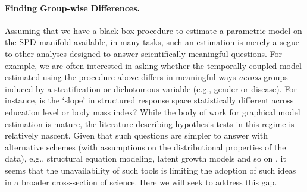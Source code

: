 \paragraph{Finding Group-wise Differences.} Assuming that we have a black-box procedure to estimate a parametric model on the $\text{SPD}$ manifold available, 
in many tasks, such an estimation is merely a segue to other analyses designed to answer scientifically meaningful questions. 
For example, we are often interested in asking whether the temporally coupled model estimated using the procedure above differs 
in meaningful ways {\em across} groups induced by a stratification or dichotomous variable (e.g., gender or disease). For instance, is the `slope' in structured response space statistically different 
across education level or body mass index? 
While the body of work for graphical model estimation is mature, the literature describing hypothesis tests in this
regime \citep{diffnet,belilovsky2015hypothesis}
is relatively nascent.
Given that such questions are simpler to answer with alternative schemes (with assumptions on the distributional properties of the data), e.g., structural equation modeling, 
latent growth models and so on \citep{ullman2003structural, mcardle2000introduction}, it seems that 
the unavailability of such tools is limiting the adoption of such ideas in a broader 
cross-section of science. Here we will seek to address this gap. 

